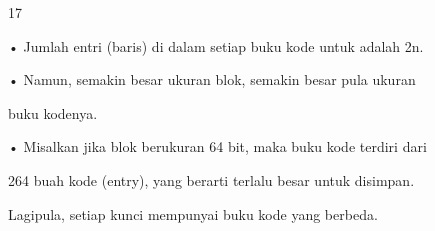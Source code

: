 \documentclass{article}
\begin{document}

17

• Jumlah entri (baris) di dalam setiap buku kode untuk  adalah 2n. 

• Namun, semakin besar ukuran blok, semakin besar pula ukuran 

buku kodenya. 

• Misalkan jika blok berukuran  64 bit, maka buku kode terdiri dari 

264 buah kode (entry), yang berarti terlalu besar untuk disimpan. 

Lagipula, setiap kunci mempunyai buku kode yang berbeda.
\end{document}
